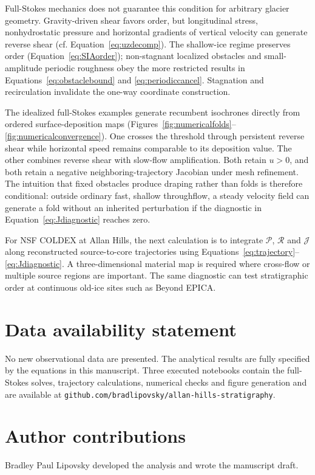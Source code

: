 \documentclass[review]{igs}
\theoremstyle{definition}
\theoremstyle{remark}
\newcommand{\Rpos}{\mathcal{P}}
\newcommand{\Rneg}{\mathcal{R}}
\newcommand{\Jord}{\mathcal{J}}
\begin{document}
Full-Stokes mechanics does not guarantee this condition for arbitrary glacier geometry. Gravity-driven shear favors order, but longitudinal stress, nonhydrostatic pressure and horizontal gradients of vertical velocity can generate reverse shear (cf. Equation~\eqref{eq:uzdecomp}). The shallow-ice regime preserves order (Equation~\eqref{eq:SIAorder}); non-stagnant localized obstacles and small-amplitude periodic roughness obey the more restricted results in Equations~\eqref{eq:obstaclebound} and \eqref{eq:periodiccancel}. Stagnation and recirculation invalidate the one-way coordinate construction.

The idealized full-Stokes examples generate recumbent isochrones directly from ordered surface-deposition maps (Figures~\ref{fig:numericalfolds}--\ref{fig:numericalconvergence}). One crosses the threshold through persistent reverse shear while horizontal speed remains comparable to its deposition value. The other combines reverse shear with slow-flow amplification. Both retain \(u>0\), and both retain a negative neighboring-trajectory Jacobian under mesh refinement. The intuition that fixed obstacles produce draping rather than folds is therefore conditional: outside ordinary fast, shallow throughflow, a steady velocity field can generate a fold without an inherited perturbation if the diagnostic in Equation~\eqref{eq:Jdiagnostic} reaches zero.

For NSF COLDEX at Allan Hills, the next calculation is to integrate \(\Rpos\), \(\Rneg\) and \(\Jord\) along reconstructed source-to-core trajectories using Equations~\eqref{eq:trajectory}--\eqref{eq:Jdiagnostic}. A three-dimensional material map is required where cross-flow or multiple source regions are important. The same diagnostic can test stratigraphic order at continuous old-ice sites such as Beyond EPICA.

\section*{Data availability statement}
No new observational data are presented. The analytical results are fully specified by the equations in this manuscript. Three executed notebooks contain the full-Stokes solves, trajectory calculations, numerical checks and figure generation and are available at \texttt{github.com/bradlipovsky/allan-hills-stratigraphy}.

\section*{Author contributions}
Bradley Paul Lipovsky developed the analysis and wrote the manuscript draft.
\end{document}
